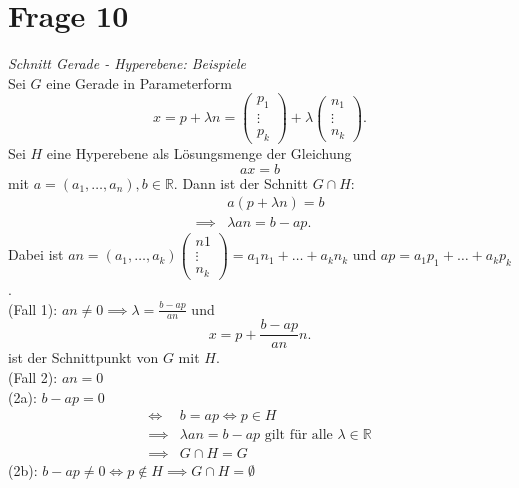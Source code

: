 \section{Frage 10}
\textit{Schnitt Gerade - Hyperebene: Beispiele}\\
Sei $G$ eine Gerade in Parameterform 
\[ 
    x=p+\lambda n = \begin{pmatrix}
        p_1\\\vdots\\p_k
    \end{pmatrix} + \lambda \begin{pmatrix}
        n_1\\ \vdots \\n_k
    \end{pmatrix}
.\]
Sei $H$ eine Hyperebene als Lösungsmenge der Gleichung
\[
    ax=b
\]
mit $a=(a_1,\dots,a_n), b\in \mathbb{R}$. Dann ist der Schnitt
$G \cap H$:
\begin{align*}
    &a(p + \lambda n) = b\\
    \implies &\lambda a n = b - ap
.\end{align*}
Dabei ist $an = (a_1,\dots,a_k)\begin{pmatrix}
    n1\\ \vdots\\n_k
\end{pmatrix} = a_1n_1+\dots + a_kn_k$ und $ap = a_1p_1 +\dots + a_kp_k$.\\
(Fall 1): $an \neq 0 \implies \lambda = \frac{b-ap}{an}$ und
\[
    x = p + \frac{b-ap}{an} n   
.\]
ist der Schnittpunkt von $G$ mit $H$.\\
(Fall 2): $an=0$\\
(2a): $b-ap = 0$ 
\begin{align*}
    \Longleftrightarrow\ & b = ap \Leftrightarrow p \in H\\
    \implies & \lambda an = b-ap \text{ gilt für alle } \lambda\in\mathbb{R}\\
    \implies & G\cap H = G
\end{align*}
(2b): $b-ap\neq 0 \Leftrightarrow p\notin H \implies G\cap H = \emptyset$
